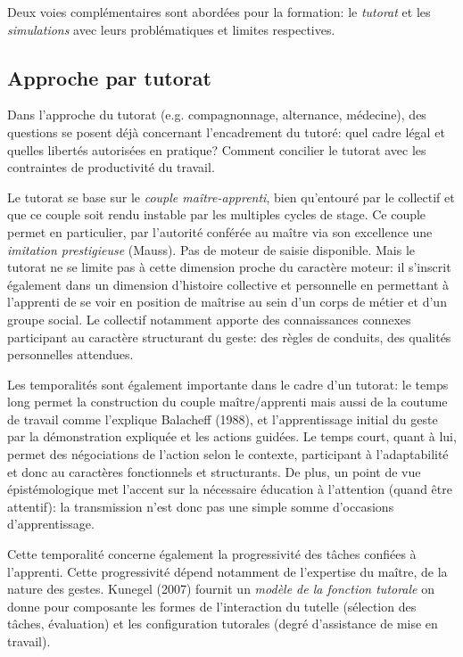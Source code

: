 \documentclass{article}
\begin{document}
Deux voies complémentaires sont abordées pour la formation: le 
\emph{tutorat} et les \emph{simulations} avec leurs problématiques et 
limites respectives.
\\

\subsection{Approche par tutorat}

Dans l'approche du tutorat (e.g. compagnonnage, alternance, médecine), 
des questions se posent déjà concernant l'encadrement du tutoré: quel 
cadre légal et quelles libertés autorisées en pratique? Comment concilier 
le tutorat avec les contraintes de productivité du travail.

Le tutorat se base sur le \emph{couple maître-apprenti}, bien qu'entouré 
par le collectif et que ce couple soit rendu instable par les multiples 
cycles de stage. Ce couple permet en particulier, par l'autorité conférée 
au maître via son excellence une \emph{imitation prestigieuse} (Mauss). 
Pas de moteur de saisie disponible. Mais le tutorat ne se limite pas à 
cette dimension proche du caractère moteur: il s'inscrit également dans 
un dimension d'histoire collective et personnelle en permettant à 
l'apprenti de se voir en position de maîtrise au sein d'un corps de 
métier et d'un groupe social. Le collectif notamment apporte des 
connaissances connexes participant au caractère structurant du geste: des 
règles de conduits, des qualités personnelles attendues.

Les temporalités sont également importante dans le cadre d'un tutorat: le 
temps long permet la construction du couple maître/apprenti mais aussi de 
la coutume de travail comme l'explique Balacheff (1988), et 
l'apprentissage initial du geste par la démonstration expliquée et les 
actions guidées. Le temps court, quant à lui, permet des négociations de 
l'action selon le contexte, participant à l'adaptabilité et donc au 
caractères fonctionnels et structurants.
De plus, un point de vue épistémologique met l'accent sur la nécessaire 
éducation à l'attention (quand être attentif): la transmission n'est donc 
pas une simple somme d'occasions d'apprentissage.

Cette temporalité concerne également la progressivité des tâches confiées 
à l'apprenti. Cette progressivité dépend notamment de l'expertise du 
maître, de la nature des gestes.
Kunegel (2007) fournit un \emph{modèle de la fonction tutorale} on donne 
pour composante les formes de l'interaction du tutelle (sélection des 
tâches, évaluation) et les configuration tutorales (degré d'assistance 
de mise en travail).
\end{document}
